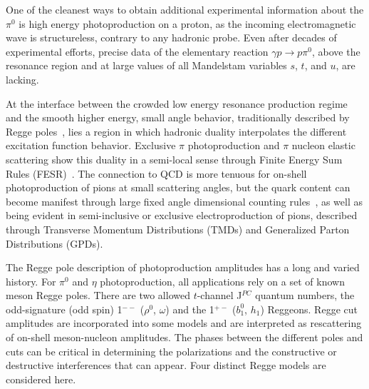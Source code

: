 \documentclass[aps,prc,twocolumn,floatfix,showpacs,preprintnumbers,amsmath,amssymb,superscriptaddress,linenumbers]{revtex4-1}
\begin{document}
One of the cleanest ways to obtain additional experimental information about the $\pi^0$ is high energy photoproduction on a proton, as the incoming electromagnetic wave is structureless, contrary to any hadronic probe. Even after decades of experimental efforts, precise data of the elementary reaction $\gamma  p \rightarrow p\pi^0 $, above the resonance region and at large values of all Mandelstam variables $s$, $t$, and $u$, are lacking.

At the interface between the crowded low energy resonance 
production regime and the smooth higher energy, small angle behavior, 
traditionally described by Regge poles~\cite{Ader:1967tqj}, lies a 
region in which hadronic duality interpolates the different excitation function
behavior. Exclusive $\pi$ photoproduction and $\pi$ nucleon elastic 
scattering show this duality in a semi-local sense through Finite Energy 
Sum Rules (FESR)~\cite{Armenian:1974xd}. The connection to QCD is more 
tenuous for on-shell photoproduction of pions at small scattering angles, 
but the quark content can become manifest through large fixed angle 
dimensional counting rules~\cite{Brodsky:1973kr}, as well as being evident 
in semi-inclusive or exclusive electroproduction of pions, described 
through Transverse Momentum Distributions (TMDs)  and Generalized Parton 
Distributions (GPDs).


The Regge pole description of photoproduction amplitudes 
has a long and varied history. For $\pi^0$ and $\eta$ photoproduction, 
all applications rely on a set of known meson Regge poles. There are 
two allowed $t$-channel J$^{PC}$ quantum numbers, the odd-signature (odd spin) 
1$^{--}$ ($\rho^0$, $\omega$) and the 1$^{+-}$ ($b^0_1$, $h_1$) Reggeons. Regge cut amplitudes are 
incorporated into some models and are interpreted as rescattering of 
on-shell meson-nucleon amplitudes.  The phases between the different 
poles and cuts can be critical in determining the polarizations and the 
constructive or destructive interferences that can appear. Four distinct Regge models 
are considered here.
\end{document}
